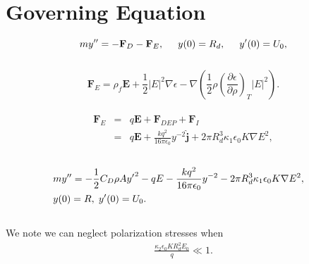 \documentclass[10pt,a4paper]{article}
\begin{document}
\section*{Governing Equation}
\begin{equation*}
m y'' = - \mathbf{F}_D - \mathbf{F}_E, \hspace{5 mm} y(0) = R_d, \hspace{5 mm} y'(0) = U_0,
\label{gov_eqn}
\end{equation*}
\\
\begin{equation*}\label{force_density}
\mathbf{F}_E = \rho_f \mathbf{E} + \frac{1}{2} \left| E \right|^2 \nabla \epsilon - \nabla \left( \frac{1}{2} \rho \left( \frac{\partial \epsilon}{\partial \rho} \right)_T \left| E \right|^2 \right) .
\end{equation*}
\\
\begin{eqnarray*}
 \mathbf{F}_E &=& q \mathbf{E} + \mathbf{F}_{DEP} + \mathbf{F}_I \\
 &=& q \mathbf{E} + \frac{k q^2}{16 \pi \epsilon_0 } y^{-2} \hat{\mathbf{j}} + 2 \pi R_d^3 \kappa_1 \epsilon_0 K \nabla E^2, 
\end{eqnarray*}
\\
\begin{eqnarray*} \label{gov_eqn_subs}
&m y'' = - \frac{1}{2} C_D \rho A {y'}^2 - q E - \frac{k q^2}{16 \pi \epsilon_0} y^{-2}- 2 \pi R_d^3 \kappa_1 \epsilon_0 K \nabla E^2,& \nonumber \\
&y(0) = R, \hspace{1 mm} y'(0) = U_0 .&
\end{eqnarray*}
\\
We note we can neglect polarization stresses when
\begin{eqnarray}
\frac{ \kappa_2 \epsilon_0 K R_d^2 E_0}{q} \ll 1. \nonumber
\end{eqnarray}

\newpage
\end{document}
